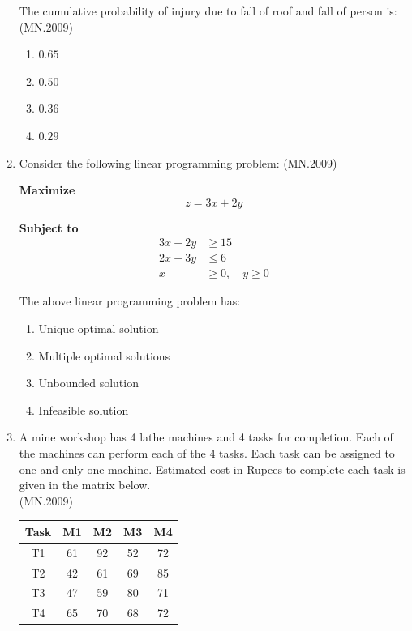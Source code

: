 \documentclass[journal]{IEEEtran}
\numberwithin{equation}{enumi}
\numberwithin{figure}{enumi}
\begin{document}
\begin{enumerate}
The cumulative probability of injury due to fall of roof and fall of person is:
\hfill{(MN.2009)}
\begin{enumerate}[label=(\Alph*)]
\item $0.65$
\item $0.50$
\item $0.36$
\item $0.29$
\end{enumerate}

\item Consider the following linear programming problem:
\hfill{(MN.2009)}

\textbf{Maximize}
\[
z = 3x + 2y
\]

\textbf{Subject to}
\[
\begin{aligned}
3x + 2y &\geq 15 \\
2x + 3y &\leq 6 \\
x &\geq 0,\quad y \geq 0
\end{aligned}
\]

The above linear programming problem has:

\begin{enumerate}[label=(\Alph*)]
\item Unique optimal solution
\item Multiple optimal solutions
\item Unbounded solution
\item Infeasible solution
\end{enumerate}

\item A mine workshop has 4 lathe machines and 4 tasks for completion. Each of the machines can perform each of the 4 tasks. Each task can be assigned to one and only one machine. Estimated cost in Rupees to complete each task is given in the matrix below.\\
\hfill{(MN.2009)}
\begin{center}
\begin{tabular}{|c|c|c|c|c|}
\hline
\textbf{Task} & \textbf{M1} & \textbf{M2} & \textbf{M3} & \textbf{M4} \\
\hline
T1 & 61 & 92 & 52 & 72 \\
T2 & 42 & 61 & 69 & 85 \\
T3 & 47 & 59 & 80 & 71 \\
T4 & 65 & 70 & 68 & 72 \\
\hline
\end{tabular}
\end{center}



\end{enumerate}
\end{document}
